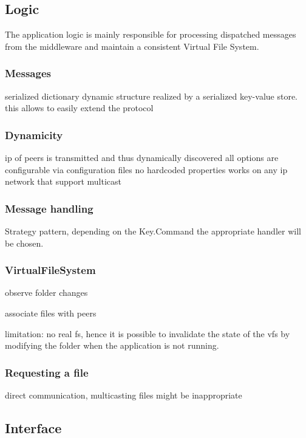 \subsection{Logic}

The application logic is mainly responsible for processing dispatched messages from the middleware and maintain a consistent Virtual File System.
    
    \subsubsection{Messages}
    serialized dictionary
    dynamic structure realized by a serialized key-value store. 
    this allows to easily extend the protocol

    \subsubsection{Dynamicity}
    ip of peers is transmitted and thus dynamically discovered
    all options are configurable via configuration files
    no hardcoded properties
    works on any ip network that support multicast
    
    
    \subsubsection{Message handling}
    Strategy pattern, depending on the Key.Command the appropriate handler will be chosen.
    
    \subsubsection{VirtualFileSystem}
    
    observe folder changes
    
    associate files with peers
    
    limitation: no real fs, hence it is possible to invalidate the state of the vfs by modifying the folder when the application is not running. 
    
    \subsubsection{Requesting a file}
    
    direct communication, multicasting files might be inappropriate
    

    
    
    

\subsection{Interface}